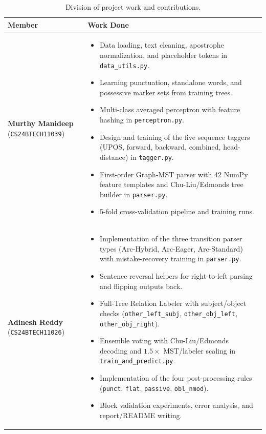 \documentclass[11pt,a4paper]{article}
\begin{document}
\begin{table}[H]
\centering
\caption{Division of project work and contributions.}
\label{tab:contributions}
\begin{tabular}{@{}p{4.1cm}>{\raggedright\arraybackslash}p{10.9cm}@{}}
\toprule
\textbf{Member} & \textbf{Work Done} \\
\midrule
\textbf{Murthy Manideep} \newline (\texttt{CS24BTECH11039}) &
\begin{itemize}[noitemsep,topsep=0pt,partopsep=0pt,leftmargin=*,before=\vspace{-0.5\baselineskip},after=\vspace{-\baselineskip}]
    \item Data loading, text cleaning, apostrophe normalization, and placeholder tokens in \texttt{data\_utils.py}.
    \item Learning punctuation, standalone words, and possessive marker sets from training trees.
    \item Multi-class averaged perceptron with feature hashing in \texttt{perceptron.py}.
    \item Design and training of the five sequence taggers (UPOS, forward, backward, combined, head-distance) in \texttt{tagger.py}.
    \item First-order Graph-MST parser with 42 NumPy feature templates and Chu-Liu/Edmonds tree builder in \texttt{parser.py}.
    \item 5-fold cross-validation pipeline and training runs.
\end{itemize} \\
\midrule
\textbf{Adinesh Reddy} \newline (\texttt{CS24BTECH11026}) &
\begin{itemize}[noitemsep,topsep=0pt,partopsep=0pt,leftmargin=*,before=\vspace{-0.5\baselineskip},after=\vspace{-\baselineskip}]
    \item Implementation of the three transition parser types (Arc-Hybrid, Arc-Eager, Arc-Standard) with mistake-recovery training in \texttt{parser.py}.
    \item Sentence reversal helpers for right-to-left parsing and flipping outputs back.
    \item Full-Tree Relation Labeler with subject/object checks (\texttt{other\_left\_subj}, \texttt{other\_obj\_left}, \texttt{other\_obj\_right}).
    \item Ensemble voting with Chu-Liu/Edmonds decoding and $1.5\times$ MST/labeler scaling in \texttt{train\_and\_predict.py}.
    \item Implementation of the four post-processing rules (\texttt{punct}, \texttt{flat}, \texttt{passive}, \texttt{obl\_nmod}).
    \item Block validation experiments, error analysis, and report/README writing.
\end{itemize} \\
\bottomrule
\end{tabular}
\end{table}
\end{document}
